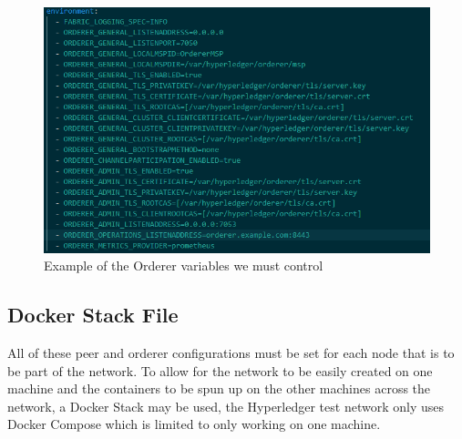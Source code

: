 \begin{figure}[h]
    \centering
    \includegraphics[width=1\columnwidth]{ordererenviro.PNG}
    \caption{Example of the Orderer variables we must control}
    \label{fig:my_label}
\end{figure}

\subsection{Docker Stack File}

All of these peer and orderer configurations must be set for each node that is to be part of the network. To allow for the network to be easily created on one machine and the containers to be spun up on the other machines across the network, a Docker Stack may be used, the Hyperledger test network only uses Docker Compose which is limited to only working on one machine. 

